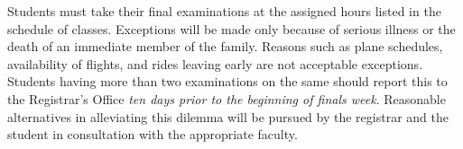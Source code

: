 Students must take their final examinations at the assigned hours
listed in the schedule of classes.
Exceptions will be made only because of serious illness
or the death of an immediate member of the family.
Reasons such as
plane schedules,
availability of flights,
and rides leaving early
are not acceptable exceptions.
Students having more than two examinations on the same
should report this to the Registrar's Office
\emph{ten days prior to the beginning of finals week}.
Reasonable alternatives in alleviating this dilemma
will be pursued by the registrar
and the student in consultation with the appropriate faculty.
